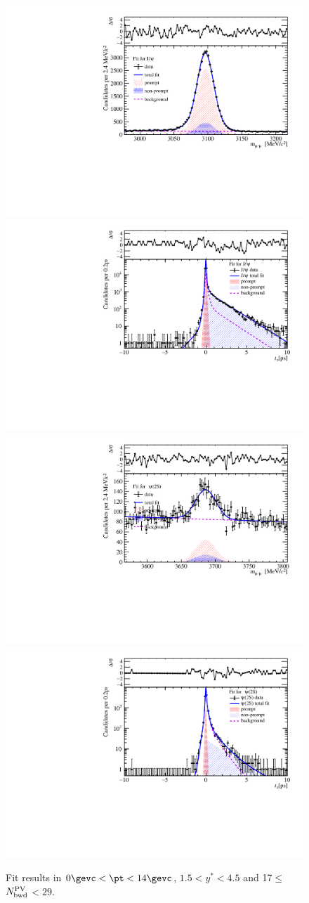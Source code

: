 \begin{figure}[H]
\begin{center}
\includegraphics[width=0.45\linewidth]{pdf/pPb/BWorkdir/TwoDimFit/ProjMass/Jpsi_n2y1pt1.pdf}
\includegraphics[width=0.45\linewidth]{pdf/pPb/BWorkdir/TwoDimFit/ProjTz/Jpsi_n2y1pt1.pdf}
\vspace*{-0.5cm}
\includegraphics[width=0.45\linewidth]{pdf/pPb/BWorkdir/TwoDimFit/ProjMass/Psi2S_n2y1pt1.pdf}
\includegraphics[width=0.45\linewidth]{pdf/pPb/BWorkdir/TwoDimFit/ProjTz/Psi2S_n2y1pt1.pdf}
\vspace*{-0.5cm}
\end{center}
\caption{Fit results in $0\gevc<\pt<14\gevc$, $1.5<y^*<4.5$ and 17$\leq$$N_{\rm bwd}^{\rm PV}$$<29$.}
\end{figure}
